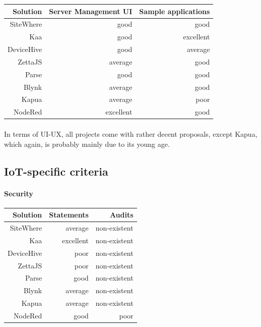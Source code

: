 \documentclass{article}
\begin{document}
\begin{center}
\begin{tabular}{r|r|r}
Solution & Server Management UI	& Sample applications \\ \hline
SiteWhere & \cellcolor{blue!10}good & \cellcolor{blue!10}good \\
Kaa & \cellcolor{blue!10}good & \cellcolor{green!25}excellent \\
DeviceHive & \cellcolor{blue!10}good & \cellcolor{yellow!25}average \\
ZettaJS & \cellcolor{yellow!25}average & \cellcolor{blue!10}good \\
Parse & \cellcolor{blue!10}good & \cellcolor{blue!10}good \\
Blynk & \cellcolor{yellow!25}average & \cellcolor{blue!10}good \\
Kapua & \cellcolor{yellow!25}average & \cellcolor{orange!25}poor \\
NodeRed & \cellcolor{green!25}excellent & \cellcolor{blue!10}good \\
\end{tabular}
\end{center}

\paragraph{} In terms of UI-UX, all projects come with rather decent proposals, except Kapua, which again, is probably mainly due to its young age.

\newpage

\subsection{IoT-specific criteria}

\paragraph{Security}

\begin{center}
\begin{tabular}{r|r|r}
Solution & Statements & Audits \\ \hline
SiteWhere & \cellcolor{yellow!25}average & \cellcolor{red!25}non-existent \\
Kaa & \cellcolor{green!25}excellent & \cellcolor{red!25}non-existent \\
DeviceHive & \cellcolor{orange!25}poor & \cellcolor{red!25}non-existent \\
ZettaJS & \cellcolor{orange!25}poor & \cellcolor{red!25}non-existent \\
Parse & \cellcolor{blue!10}good & \cellcolor{red!25}non-existent \\
Blynk & \cellcolor{yellow!25}average & \cellcolor{red!25}non-existent \\
Kapua & \cellcolor{yellow!25}average & \cellcolor{red!25}non-existent \\
NodeRed & \cellcolor{blue!10}good & \cellcolor{orange!25}poor \\
\end{tabular}
\end{center}
\end{document}
